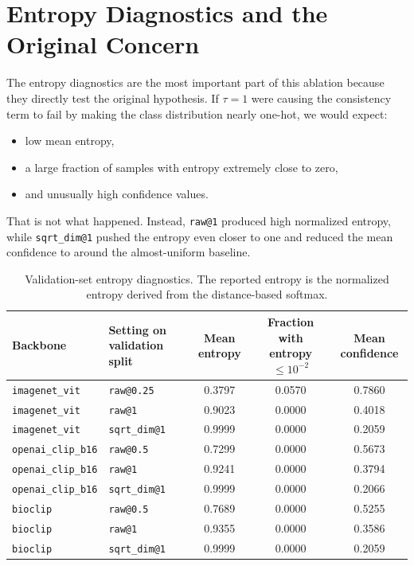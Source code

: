 \documentclass[11pt]{article}
\begin{document}
\section{Entropy Diagnostics and the Original Concern}

The entropy diagnostics are the most important part of this ablation because they directly test the original hypothesis. If $\tau = 1$ were causing the consistency term to fail by making the class distribution nearly one-hot, we would expect:
\begin{itemize}
  \item low mean entropy,
  \item a large fraction of samples with entropy extremely close to zero,
  \item and unusually high confidence values.
\end{itemize}

That is not what happened. Instead, \texttt{raw@1} produced high normalized entropy, while \texttt{sqrt\_dim@1} pushed the entropy even closer to one and reduced the mean confidence to around the almost-uniform baseline.

\begin{table}[h]
\centering
\small
\begin{tabular}{llccc}
\toprule
Backbone & Setting on validation split & Mean entropy & Fraction with entropy $\leq 10^{-2}$ & Mean confidence \\
\midrule
\texttt{imagenet\_vit} & \texttt{raw@0.25} & 0.3797 & 0.0570 & 0.7860 \\
\texttt{imagenet\_vit} & \texttt{raw@1} & 0.9023 & 0.0000 & 0.4018 \\
\texttt{imagenet\_vit} & \texttt{sqrt\_dim@1} & 0.9999 & 0.0000 & 0.2059 \\
\midrule
\texttt{openai\_clip\_b16} & \texttt{raw@0.5} & 0.7299 & 0.0000 & 0.5673 \\
\texttt{openai\_clip\_b16} & \texttt{raw@1} & 0.9241 & 0.0000 & 0.3794 \\
\texttt{openai\_clip\_b16} & \texttt{sqrt\_dim@1} & 0.9999 & 0.0000 & 0.2066 \\
\midrule
\texttt{bioclip} & \texttt{raw@0.5} & 0.7689 & 0.0000 & 0.5255 \\
\texttt{bioclip} & \texttt{raw@1} & 0.9355 & 0.0000 & 0.3586 \\
\texttt{bioclip} & \texttt{sqrt\_dim@1} & 0.9999 & 0.0000 & 0.2059 \\
\bottomrule
\end{tabular}
\caption{Validation-set entropy diagnostics. The reported entropy is the normalized entropy derived from the distance-based softmax.}
\end{table}
\end{document}
